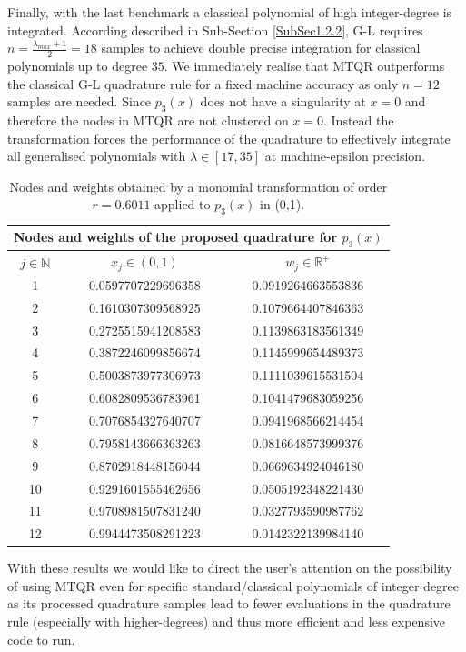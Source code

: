 \documentclass[a4paper, twosided]{book}
\begin{document}
\noindent 
Finally, with the last benchmark a classical polynomial of high integer-degree is integrated. According described in Sub-Section \ref{SubSec1.2.2}, G-L requires $n=\frac{\lambda_{max}+1}{2}=18$ samples to achieve double precise integration for classical polynomials up to degree $35$. We immediately realise that MTQR  outperforms the classical G-L quadrature rule for a fixed machine accuracy as only $n=12$ samples are needed. Since $p_3(x)$ does not have a singularity at $x=0$ and therefore the nodes in MTQR are not clustered on $x=0$. Instead the transformation forces the performance of the quadrature to effectively integrate all generalised polynomials with $\lambda\in[17,35]$ at machine-epsilon precision.

\begin{table}[H]
\centering
\begin{tabular}{|c||c|c|}
\hline
\multicolumn{3}{|c|}{\textbf{Nodes and weights of the proposed quadrature for $p_3(x)$}} \\
\hline
$j\in\mathbb{N}$ & $x_j\in(0,1)$ & $w_j\in\mathbb{R}^+$ \\
\hline
1   &  0.0597707229696358   &  0.0919264663553836  \\
2   &  0.1610307309568925   &  0.1079664407846363  \\
3   &  0.2725515941208583   &  0.1139863183561349  \\
4   &  0.3872246099856674   &  0.1145999654489373  \\
5   &  0.5003873977306973   &  0.1111039615531504  \\
6   &  0.6082809536783961   &  0.1041479683059256  \\
7   &  0.7076854327640707   &  0.0941968566214454  \\
8   &  0.7958143666363263   &  0.0816648573999376  \\
9   &  0.8702918448156044   &  0.0669634924046180  \\
10  &  0.9291601555462656   &  0.0505192348221430  \\
11  &  0.9708981507831240   &  0.0327793590987762  \\
12  &  0.9944473508291223   &  0.0142322139984140  \\
\hline
\end{tabular}
  \caption{Nodes and weights obtained by a monomial transformation of order $r=0.6011$ applied to $p_3(x)$ in (0,1).}
  \label{table2.4}
\end{table}

\noindent
With these results we would like to direct the user's attention on the possibility of using MTQR even for specific standard/classical polynomials of integer degree as its processed quadrature samples lead to fewer evaluations in the quadrature rule (especially with higher-degrees) and thus more efficient and less expensive code to run.
\end{document}
